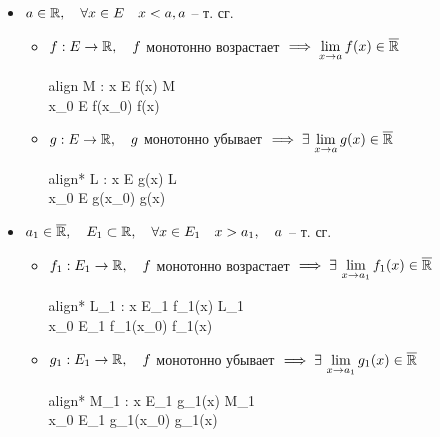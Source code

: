 \begin{theorem}
	\hfill
	\begin{itemize}
		\item $a \in \mathbb{R}, \quad \forall x \in E \quad x < a, a$ -- т. сг.
		\begin{itemize}
			\item $f : E \to \mathbb{R}, \quad f$ монотонно возрастает $\implies \lim\limits_{x \to a} f(x) \in \overline{\mathbb{R}} $
			\begin{empheq}[left={
					\liml{x \to a} f(x) \in \R \iff \empheqlbrace
				}]{align}
				 \exist M : \forall x \in E \quad f(x) \le M \\
				 \forall x_0 \in E \quad f(x_0) \le {} f(x)
			\end{empheq}
			\item $g : E \to \mathbb{R}, \quad g$ монотонно убывает $\implies \exists\, \lim\limits_{x \to a} g(x) \in \overline{\mathbb{R}} $
			\begin{empheq}[left={
					\liml{x \to a} g(x) \in \R \iff \empheqlbrace
				}]{align*}
				\exist L : \forall x \in E \quad g(x) \ge L \\
				\forall x_0 \in E \quad g(x_0) \ge {} g(x)
			\end{empheq}
		\end{itemize}
		\item $a_1 \in \overline{\mathbb{R}}, \quad E_1 \subset \mathbb{R}, \quad \forall x \in E_1 \quad x > a_1, \quad a$ -- т. сг.
		\begin{itemize}
			\item $f_1 : E_1 \to \mathbb{R}, \quad f$ монотонно возрастает $\implies \exists\, \lim\limits_{x \to a_1} f_1(x) \in \overline{\mathbb{R}} $
			\begin{empheq}[left={
					\liml{x \to a} f_1(x) \in \R \iff \empheqlbrace
				}]{align*}
				\exist L_1 : \forall x \in E_1 \quad f_1(x) \ge L_1 \\
				\forall x_0 \in E_1 \quad f_1(x_0) \ge {} f_1(x)
			\end{empheq}
			\item $g_1 : E_1 \to \mathbb{R}, \quad f$ монотонно убывает $\implies \exists\, \lim\limits_{x \to a_1} g_1(x) \in \overline{\mathbb{R}} $
			\begin{empheq}[left={
					\liml{x \to a} g_1(x) \in \R \iff \empheqlbrace
				}]{align*}
				\exist M_1 : \forall x \in E_1 \quad g_1(x) \le M_1 \\
				\forall x_0 \in E_1 \quad g_1(x_0) \le {} g_1(x)
			\end{empheq}
		\end{itemize}
	\end{itemize}
\end{theorem}


